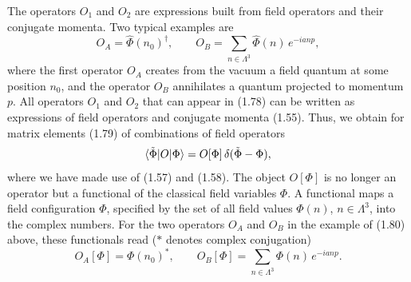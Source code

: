 The operators $O_1$ and $O_2$ are expressions built from field operators and
their conjugate momenta. Two typical examples are
\begin{equation}
  O_A = \hat{\Phi}(n_0)^\dagger, \qquad
  O_B = \sum_{n\in\Lambda^3}\hat{\Phi}(n)\,e^{-ianp},
\end{equation}
where the first operator $O_A$ creates from the vacuum a field quantum at some
position $n_0$, and the operator $O_B$ annihilates a quantum projected to
momentum $p$. All operators $O_1$ and $O_2$ that can appear in (1.78) can be
written as expressions of field operators and conjugate momenta (1.55). Thus,
we obtain for matrix elements (1.79) of combinations of field operators
\begin{equation}
  \langle\tilde{\Phi}|O|\Phi\rangle = O[\Phi]\,\delta(\tilde{\Phi} - \Phi),
\end{equation}
where we have made use of (1.57) and (1.58). The object $O[\Phi]$ is no longer
an operator but a functional of the classical field variables $\Phi$. A
functional maps a field configuration $\Phi$, specified by the set of all field
values $\Phi(n)$, $n \in \Lambda^3$, into the complex numbers. For the two
operators $O_A$ and $O_B$ in the example of (1.80) above, these functionals
read ($*$ denotes complex conjugation)
\begin{equation}
  O_A[\Phi] = \Phi(n_0)^*, \qquad
  O_B[\Phi] = \sum_{n\in\Lambda^3}\Phi(n)\,e^{-ianp}.
\end{equation}

